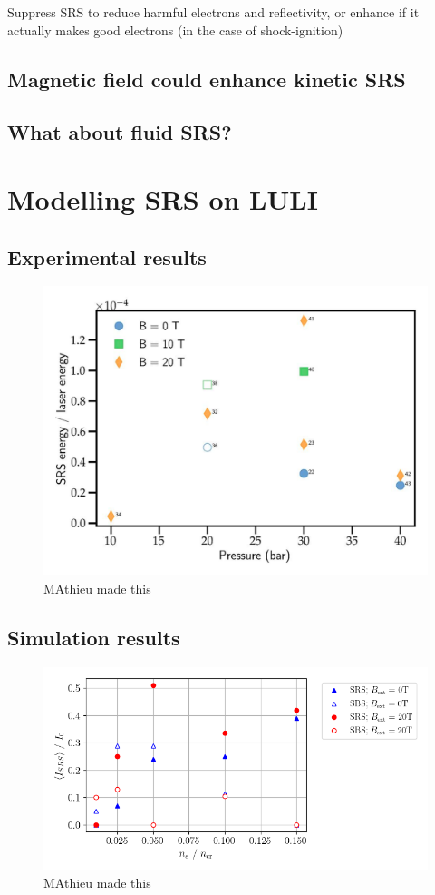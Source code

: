 Suppress SRS to reduce harmful electrons and reflectivity, or enhance if it actually makes good electrons (in the case of shock-ignition)

\subsection{Magnetic field could enhance kinetic SRS}

\subsection{What about fluid SRS?}

\section{Modelling SRS on LULI}
\subsection{Experimental results}
\begin{figure}[ht]
   \centering
    \includegraphics[width=0.8\columnwidth]{Chapters/C6_magSRS/SRS_LULI.png}
    \caption{MAthieu made this}
    \label{fig:SRS_LULI}
\end{figure}{}


\subsection{Simulation results}
\begin{figure}[ht]
   \centering
    \includegraphics[width=\columnwidth]{Chapters/C6_magSRS/LULI_sims_v3.png}
    \caption{MAthieu made this}
    \label{fig:LULI_sims_v3}
\end{figure}{}

